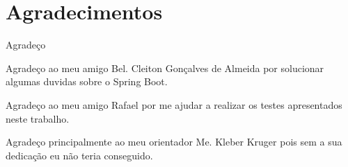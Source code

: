
\chapter{Agradecimentos} \label{Cap:Agradecimentos}


Agradeço 

Agradeço ao meu amigo Bel. Cleiton Gonçalves de Almeida por solucionar algumas duvidas sobre o Spring Boot.

Agradeço ao meu amigo Rafael por me ajudar a realizar os testes apresentados neste trabalho.

Agradeço principalmente ao meu orientador Me. Kleber Kruger pois sem a sua dedicação eu não teria conseguido.